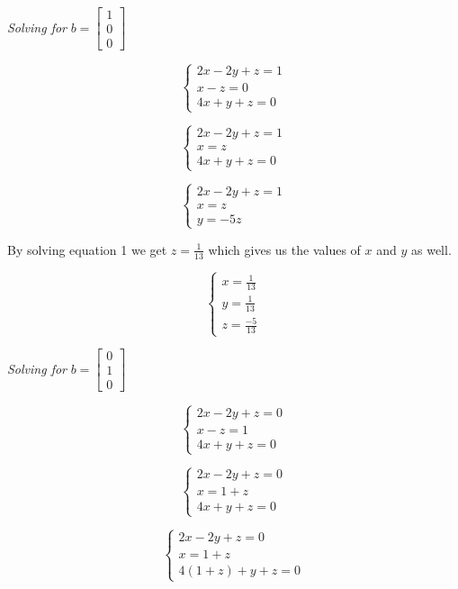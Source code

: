 \documentclass[12pt]{article}
\begin{document}
\textit{Solving for} $b = \begin{bmatrix}
  1 \\
  0 \\
  0
\end{bmatrix}$

$$\begin{cases}
  2x - 2y + z = 1 \\
  x - z = 0 \\
  4x + y + z = 0
\end{cases}$$

$$\begin{cases}
  2x - 2y + z = 1 \\
  x = z \\
  4x + y + z = 0
\end{cases}$$

$$\begin{cases}
  2x - 2y + z = 1 \\
  x = z \\
  y = -5z
\end{cases}$$

By solving equation 1 we get $z = \frac{1}{13} $ which gives us the values of $x$ and $y$ as well.

$$\begin{cases}
  x = \frac{1}{13} \\
  y = \frac{1}{13} \\
  z = \frac{-5}{13}
\end{cases}$$

\textit{Solving for} $b = \begin{bmatrix}
  0 \\
  1 \\
  0
\end{bmatrix}$

$$\begin{cases}
  2x - 2y + z = 0 \\
  x - z = 1 \\
  4x + y + z = 0
\end{cases}$$

$$\begin{cases}
  2x - 2y + z = 0 \\
  x = 1 + z \\
  4x + y + z = 0
\end{cases}$$

$$\begin{cases}
  2x - 2y + z = 0 \\
  x = 1 + z \\
  4(1 + z) + y + z = 0
\end{cases}$$
\end{document}
